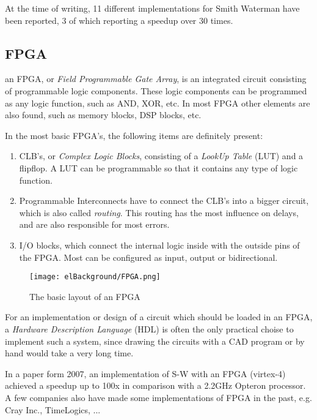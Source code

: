 At the time of writing, 11 different implementations for Smith Waterman have been reported, 3 of which reporting a speedup over 30 times.

\subsection{FPGA}

an FPGA, or \emph{Field Programmable Gate Array}, is an integrated circuit consisting of programmable logic components. These logic components can be programmed as any logic function, such as AND, XOR, etc. In most FPGA other elements are also found, such as memory blocks, DSP blocks, etc.

In the most basic FPGA's, the following items are definitely present:
\begin{enumerate}
	\item CLB's, or \emph{Complex Logic Blocks}, consisting of a \emph{LookUp Table} (LUT) and a flipflop. A LUT can be programmable so that it contains any type of logic function.
	\item Programmable Interconnects have to connect the CLB's into a bigger circuit, which is also called \emph{routing}. This routing has the most influence on delays, and are also responsible for most errors.
	\item I/O blocks, which connect the internal logic inside with the outside pins of the FPGA. Most can be configured as input, output or bidirectional.
\end{enumerate}

\begin{figure}[H]
	\centering
	\texttt{[image: elBackground/FPGA.png]}
	\caption{The basic layout of an FPGA}
	\label{fig:fpga}
\end{figure}

For an implementation or design of a circuit which should be loaded in an FPGA, a \emph{Hardware Description Language} (HDL) is often the only practical choise to implement such a system, since drawing the circuits with a CAD program or by hand would take a very long time.

In a paper form 2007, an implementation of S-W with an FPGA (virtex-4) achieved a speedup up to 100x in comparison with a 2.2GHz Opteron processor. %
A few companies also have made some implementations of FPGA in the past, e.g. Cray Inc., TimeLogics, ...

